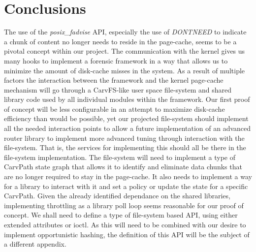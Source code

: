 \section{Conclusions}
The use of the \emph{posix\_fadvise} API, especially the use of \emph{DONTNEED} to indicate a chunk of content no longer needs to reside in the page-cache, seems to be a pivotal concept within our project. 
The communication with the kernel gives us many hooks to implement a forensic framework in a way that allows us to minimize the amount of disk-cache misses in the system. As a result of multiple factors the interaction between the framework and the kernel page-cache mechanism will go through a CarvFS-like user space file-system and shared library code used by all individual modules within the framework. Our first proof of concept will be less configurable in an attempt to maximize disk-cache efficiency than would be possible, yet our projected file-system should implement all the needed interaction points to allow a future implementation of an advanced router library to implement more advanced tuning through interaction with the file-system. That is, the services for implementing this should all be there in the file-system implementation. The file-system will need to implement a type of CarvPath state graph that allows it to identify and eliminate data chunks that are no longer required to stay in the page-cache. It also needs to implement a way for a library to interact with it and set a policy or update the state for a specific CarvPath. Given the already identified dependance on the shared libraries, implementing throttling as a library poll loop seems reasonable for our proof of concept. We shall need to define a type of file-system based API, using either extended attributes or ioctl. As this will need to be combined with our desire to implement opportunistic hashing, the definition of this API will be the subject of a different appendix.
